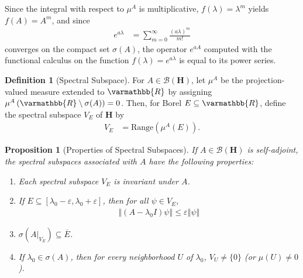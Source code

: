 \documentclass[12pt]{extarticle}
\newcommand{\R}{\varmathbb{R}}
\newcommand{\norm}[1]{\left\Vert #1\right\Vert}
\theoremstyle{plain}
\newtheorem*{proposition}{Proposition}%
\theoremstyle{definition}
\newtheorem*{definition}{Definition}
\theoremstyle{remark}
\begin{document}
  Since the integral with respect to $\mu^{A}$ is multiplicative, $f(\lambda) = \lambda^{m}$ yields $f(A) = A^{m}$, and since
  \begin{align*}
    e^{a\lambda} &= \sum_{m=0}^{\infty}\frac{(a\lambda)^{m}}{m!}
  \end{align*}
  converges on the compact set $\sigma(A)$, the operator $e^{aA}$ computed with the functional calculus on the function $f(\lambda) = e^{a\lambda}$ is equal to its power series.
  \begin{definition}[Spectral Subspace]
    For $A\in \mathcal{B}\left(\mathbf{H}\right)$, let $\mu^{A}$ be the projection-valued measure extended to $\R$ by assigning $\mu^{A}\left(\R\setminus \sigma(A)\right) = 0$. Then, for Borel $E\subseteq \R$, define the spectral subspace $V_E$ of $\mathbf{H}$ by
    \begin{align*}
      V_E &= \text{Range}\left(\mu^{A}\left(E\right)\right).
    \end{align*}
  \end{definition}
  \begin{proposition}[Properties of Spectral Subspaces]
    If $A\in \mathcal{B}\left(\mathbf{H}\right)$ is self-adjoint, the spectral subspaces associated with $A$ have the following properties:
    \begin{enumerate}[(1)]
      \item Each spectral subspace $V_E$ is invariant under $A$.
      \item If $E\subseteq [\lambda_0 - \varepsilon, \lambda_0 + \varepsilon]$, then for all $\psi \in V_E$,
        \begin{align*}
          \norm{\left(A-\lambda_0I\right)\psi}\leq \varepsilon \norm{\psi}
        \end{align*}
      \item $\displaystyle \sigma\left(A\rvert_{V_E}\right)\subseteq \overline{E}$.
      \item If $\lambda_0 \in \sigma(A)$, then for every neighborhood $U$ of $\lambda_0$, $V_U \neq \{0\}$ (or $\mu(U)\neq 0$).
    \end{enumerate}
  \end{proposition}
\end{document}
